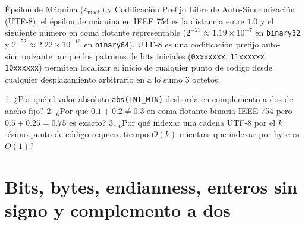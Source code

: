 \documentclass{book}
\begin{document}
\begin{tcolorbox}[title={Definición}, studiumdef, breakable]

Épsilon de Máquina (\(\varepsilon_{\text{mach}}\)) y Codificación Prefijo Libre de Auto-Sincronización (UTF-8): el épsilon de máquina en IEEE 754 es la distancia entre \(1.0\) y el siguiente número en coma flotante representable (\(2^{-23} \approx 1.19 \times 10^{-7}\) en \texttt{binary32} y \(2^{-52} \approx 2.22 \times 10^{-16}\) en \texttt{binary64}). UTF-8 es una codificación prefijo auto-sincronizante porque los patrones de bits iniciales (\texttt{0xxxxxxx}, \texttt{11xxxxxx}, \texttt{10xxxxxx}) permiten localizar el inicio de cualquier punto de código desde cualquier desplazamiento arbitrario en a lo sumo 3 octetos.
\end{tcolorbox}

\begin{tcolorbox}[title={Autoficha}, studiumcheck, breakable]

1. ¿Por qué el valor absoluto \texttt{abs(INT\_MIN)} desborda en complemento a dos de ancho fijo? 2. ¿Por qué \(0.1 + 0.2 \neq 0.3\) en coma flotante binaria IEEE 754 pero \(0.5 + 0.25 = 0.75\) es exacto? 3. ¿Por qué indexar una cadena UTF-8 por el \(k\)-ésimo punto de código requiere tiempo \(O(k)\) mientras que indexar por byte es \(O(1)\)?
\end{tcolorbox}

\section{Bits, bytes, endianness, enteros sin signo y complemento a dos}
\end{document}
